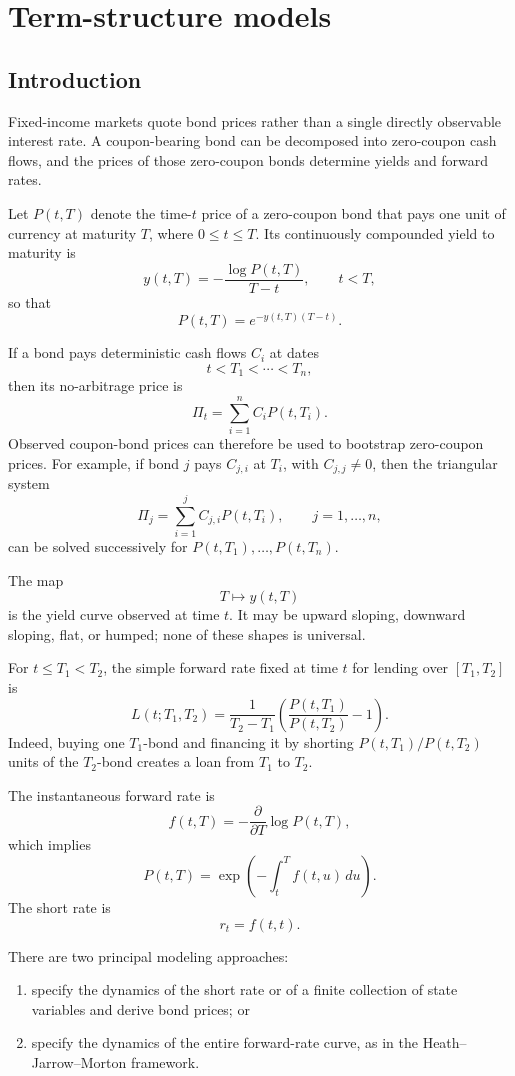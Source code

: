 \section{Term-structure models}

\subsection{Introduction}

Fixed-income markets quote bond prices rather than a single directly observable interest rate. A coupon-bearing bond can be decomposed into zero-coupon cash flows, and the prices of those zero-coupon bonds determine yields and forward rates.

Let $P(t,T)$ denote the time-$t$ price of a zero-coupon bond that pays one unit of currency at maturity $T$, where $0\leq t\leq T$. Its continuously compounded yield to maturity is
\[
y(t,T)
=-\frac{\log P(t,T)}{T-t},
\qquad t<T,
\]
so that
\[
P(t,T)=e^{-y(t,T)(T-t)}.
\]

If a bond pays deterministic cash flows $C_i$ at dates
\[
t<T_1<\cdots<T_n,
\]
then its no-arbitrage price is
\[
\Pi_t=\sum_{i=1}^n C_iP(t,T_i).
\]
Observed coupon-bond prices can therefore be used to bootstrap zero-coupon prices. For example, if bond $j$ pays $C_{j,i}$ at $T_i$, with $C_{j,j}\neq0$, then the triangular system
\[
\Pi_j=\sum_{i=1}^j C_{j,i}P(t,T_i),
\qquad j=1,\ldots,n,
\]
can be solved successively for $P(t,T_1),\ldots,P(t,T_n)$.

The map
\[
T\longmapsto y(t,T)
\]
is the yield curve observed at time $t$. It may be upward sloping, downward sloping, flat, or humped; none of these shapes is universal.

For $t\leq T_1<T_2$, the simple forward rate fixed at time $t$ for lending over $[T_1,T_2]$ is
\[
L(t;T_1,T_2)
=\frac{1}{T_2-T_1}
 \left(\frac{P(t,T_1)}{P(t,T_2)}-1\right).
\]
Indeed, buying one $T_1$-bond and financing it by shorting
$P(t,T_1)/P(t,T_2)$ units of the $T_2$-bond creates a loan from $T_1$ to $T_2$.

The instantaneous forward rate is
\[
f(t,T)
=-\frac{\partial}{\partial T}\log P(t,T),
\]
which implies
\[
P(t,T)
=\exp\!\left(-\int_t^Tf(t,u)\,du\right).
\]
The short rate is
\[
r_t=f(t,t).
\]

There are two principal modeling approaches:
\begin{enumerate}
    \item specify the dynamics of the short rate or of a finite collection of state variables and derive bond prices; or
    \item specify the dynamics of the entire forward-rate curve, as in the Heath--Jarrow--Morton framework.
\end{enumerate}

